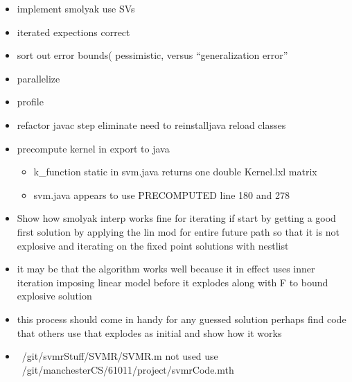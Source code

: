 \documentclass[hyperref]{labbook}
\begin{document}
  \begin{itemize}
  \item implement smolyak use SVs
  \item iterated expections correct
  \item sort out error bounds( pessimistic, versus ``generalization error''
  \item parallelize
  \item profile
  \item refactor javac step eliminate need to reinstalljava reload classes
  \item precompute kernel in export to java
    \begin{itemize}
    \item k\_function static in svm.java returns one double Kernel.lxl matrix
    \item svm.java appears to use PRECOMPUTED line 180 and 278 
    \end{itemize}

  \item Show how smolyak interp works fine for iterating if start by getting
    a good first solution by applying the lin mod for entire future path so that it is not explosive and iterating on the fixed point solutions  with nestlist
    
  \item it may be that the algorithm works well because it in effect uses inner  iteration imposing linear model before it explodes along with F to bound explosive solution 
  \item this process should come in handy for any guessed solution perhaps
    find code that others use that explodes as initial and show how it works
  \end{itemize}
  


\begin{itemize}
\item ~/git/svmrStuff/SVMR/SVMR.m not used  use ~/git/manchesterCS/61011/project/svmrCode.mth
\end{itemize}
\end{document}
